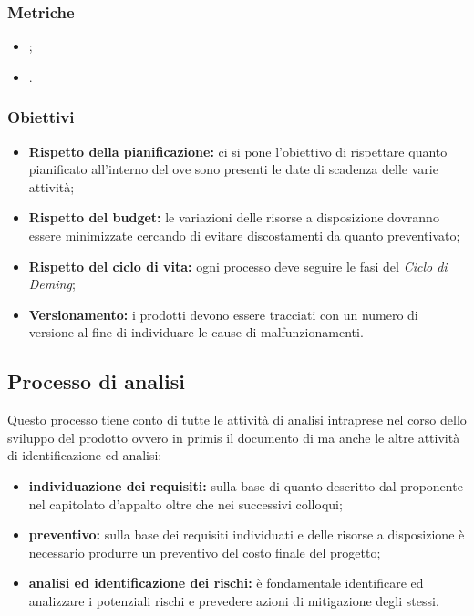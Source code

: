 \subsubsection{Metriche}

\begin{itemize}
    \item {};
    \item {}.
\end{itemize}

\subsubsection{Obiettivi}
\begin{itemize}
    \item \textbf{Rispetto della pianificazione:} ci si pone l'obiettivo di rispettare quanto pianificato all'interno del 
          ove sono presenti le date di scadenza delle varie attività;
    \item \textbf{Rispetto del budget:} le variazioni delle risorse a disposizione dovranno essere minimizzate cercando di evitare discostamenti da quanto preventivato;
    \item \textbf{Rispetto del ciclo di vita:} ogni processo deve seguire le fasi del \textit{Ciclo di Deming};
    \item \textbf{Versionamento:} i prodotti devono essere tracciati con un numero di versione al fine di individuare le cause di malfunzionamenti.
\end{itemize}

\subsection{Processo di analisi}
Questo processo tiene conto di tutte le attività di analisi intraprese nel corso dello sviluppo del prodotto ovvero in primis il documento di 
ma anche le altre attività di identificazione ed analisi:

\begin{itemize}
    \item  \textbf{individuazione dei requisiti:} sulla base di quanto descritto dal proponente nel capitolato d'appalto oltre che nei successivi colloqui;
    \item \textbf{preventivo:} sulla base dei requisiti individuati e delle risorse a disposizione è necessario produrre un preventivo del costo finale del progetto;
    \item \textbf{analisi ed identificazione dei rischi:} è fondamentale identificare ed analizzare i potenziali rischi e prevedere azioni di mitigazione degli stessi.
\end{itemize}

